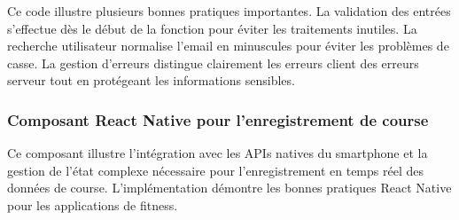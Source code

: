 Ce code illustre plusieurs bonnes pratiques importantes. La validation des entrées s'effectue dès le début de la fonction pour éviter les traitements inutiles. La recherche utilisateur normalise l'email en minuscules pour éviter les problèmes de casse. La gestion d'erreurs distingue clairement les erreurs client des erreurs serveur tout en protégeant les informations sensibles.

\subsubsection{Composant React Native pour l'enregistrement de course}

Ce composant illustre l'intégration avec les APIs natives du smartphone et la gestion de l'état complexe nécessaire pour l'enregistrement en temps réel des données de course. L'implémentation démontre les bonnes pratiques React Native pour les applications de fitness.

